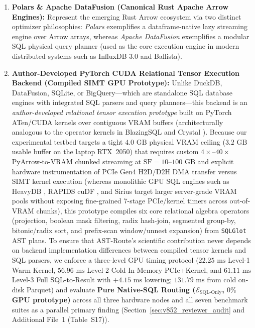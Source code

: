 \documentclass[10pt,a4paper]{article}
\begin{document}
\begin{enumerate}[leftmargin=1.5em,itemsep=0.8pt]
    \item \textbf{Polars \& Apache DataFusion (Canonical Rust Apache Arrow Engines):} Represent the emerging Rust Arrow ecosystem via two distinct optimizer philosophies: \emph{Polars} exemplifies a dataframe-native lazy streaming engine over Arrow arrays, whereas \emph{Apache DataFusion} \cite{lamb2024datafusion} exemplifies a modular SQL physical query planner (used as the core execution engine in modern distributed systems such as InfluxDB 3.0 and Ballista).
    \item \textbf{Author-Developed PyTorch CUDA Relational Tensor Execution Backend (Compiled SIMT GPU Prototype):} Unlike DuckDB, DataFusion, SQLite, or BigQuery---which are standalone SQL database engines with integrated SQL parsers and query planners---this backend is an \emph{author-developed relational tensor execution prototype} built on PyTorch ATen/CUDA kernels over contiguous VRAM buffers (architecturally analogous to the operator kernels in BlazingSQL \cite{kim2022blazingsql} and Crystal \cite{shanbhag2020crystal}). Because our experimental testbed targets a tight $4.0\text{ GB}$ physical VRAM ceiling ($3.2\text{ GB}$ usable buffer on the laptop RTX~2050) that requires custom $4\times\text{--}40\times$ PyArrow-to-VRAM chunked streaming at $\text{SF}=10\text{--}100\text{ GB}$ and explicit hardware instrumentation of PCIe Gen4 H2D/D2H DMA transfer versus SIMT kernel execution (whereas monolithic GPU SQL engines such as HeavyDB \cite{root2019mapd}, RAPIDS cuDF \cite{kim2022blazingsql}, and Sirius \cite{yogatama2025sirius} target larger server-grade VRAM pools without exposing fine-grained 7-stage PCIe/kernel timers across out-of-VRAM chunks), this prototype compiles six core relational algebra operators (projection, boolean mask filtering, radix hash-join, segmented group-by, bitonic/radix sort, and prefix-scan window/unnest expansion) from \texttt{SQLGlot} AST plans. To ensure that AST-Route's scientific contribution never depends on backend implementation differences between compiled tensor kernels and SQL parsers, we enforce a three-level GPU timing protocol ($22.25\text{ ms}$ Level-1 Warm Kernel, $56.96\text{ ms}$ Level-2 Cold In-Memory PCIe+Kernel, and $61.11\text{ ms}$ Level-3 Full SQL-to-Result with $+4.15\text{ ms}$ lowering; $131.79\text{ ms}$ from cold on-disk Parquet) and evaluate \textbf{Pure Native-SQL Routing ($\mathcal{E}_{\text{SQL-Only}}$, $0\%$ GPU prototype)} across all three hardware nodes and all seven benchmark suites as a parallel primary finding (Section~\ref{sec:v852_reviewer_audit} and Additional File~1 (Table~S17)).
\end{enumerate}
\end{document}

